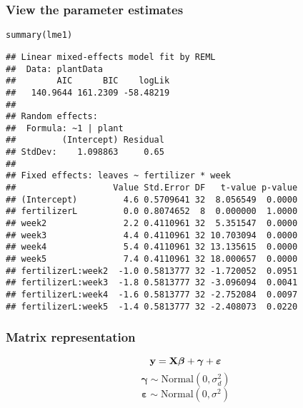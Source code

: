 \documentclass[color=usenames,dvipsnames]{beamer}\usepackage[]{graphicx}\usepackage[]{color}
\makeatletter
\newcommand{\hlstd}[1]{\textcolor[rgb]{0,0,0}{#1}}%
\newcommand{\hlkwd}[1]{\textcolor[rgb]{0.004,0.004,0.506}{#1}}%
\newenvironment{kframe}{%
 \def\at@end@of@kframe{}%
 \ifinner\ifhmode%
  \def\at@end@of@kframe{\end{minipage}}%
  \begin{minipage}{\columnwidth}%
 \fi\fi%
 \def\FrameCommand##1{\hskip\@totalleftmargin \hskip-\fboxsep
 \colorbox{shadecolor}{##1}\hskip-\fboxsep
     \hskip-\linewidth \hskip-\@totalleftmargin \hskip\columnwidth}%
 \MakeFramed {\advance\hsize-\width
   \@totalleftmargin\z@ \linewidth\hsize
   \@setminipage}}%
 {\par\unskip\endMakeFramed%
 \at@end@of@kframe}
\newenvironment{knitrout}{}{} %
\makeatother
\begin{document}
\begin{frame}[fragile]
  \frametitle{View the parameter estimates}

\small
\begin{knitrout}\scriptsize
{}\color{fgcolor}\begin{kframe}
\begin{alltt}
\hlkwd{summary}\hlstd{(lme1)}
\end{alltt}
\begin{verbatim}
## Linear mixed-effects model fit by REML
##  Data: plantData
##        AIC      BIC    logLik
##   140.9644 161.2309 -58.48219
##
## Random effects:
##  Formula: ~1 | plant
##         (Intercept) Residual
## StdDev:    1.098863     0.65
##
## Fixed effects: leaves ~ fertilizer * week
##                   Value Std.Error DF   t-value p-value
## (Intercept)         4.6 0.5709641 32  8.056549  0.0000
## fertilizerL         0.0 0.8074652  8  0.000000  1.0000
## week2               2.2 0.4110961 32  5.351547  0.0000
## week3               4.4 0.4110961 32 10.703094  0.0000
## week4               5.4 0.4110961 32 13.135615  0.0000
## week5               7.4 0.4110961 32 18.000657  0.0000
## fertilizerL:week2  -1.0 0.5813777 32 -1.720052  0.0951
## fertilizerL:week3  -1.8 0.5813777 32 -3.096094  0.0041
## fertilizerL:week4  -1.6 0.5813777 32 -2.752084  0.0097
## fertilizerL:week5  -1.4 0.5813777 32 -2.408073  0.0220
\end{verbatim}
\end{kframe}
\end{knitrout}
\end{frame}








\begin{frame}
  \frametitle{Matrix representation}
  \Large
  \[
    {\bf y} = {\bf X}{\bm \beta} + {\bm \gamma} + {\bm \varepsilon}
  \]
  \pause
  \[
    {\bm \gamma} \sim \mbox{Normal}(0, \sigma^2_d)
  \]
  \[
    {\bm \varepsilon} \sim \mbox{Normal}(0, \sigma^2)
  \]
\end{frame}
\end{document}
